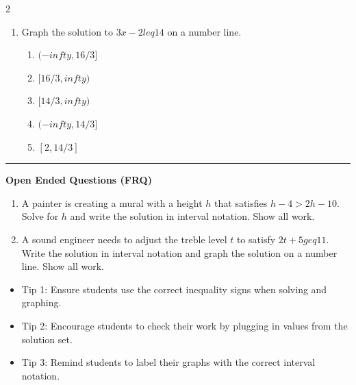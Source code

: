 \documentclass[10pt]{article}
\begin{document}
\begin{multicols}{2}
\begin{enumerate}[label=\textbf{Q\arabic*.}, leftmargin=*, itemsep=6pt, parsep=0pt]
  \item \small Graph the solution to $3x - 2 leq 14$ on a number line.
  \begin{enumerate}[label=(\Alph*), leftmargin=0.6cm, nosep, itemsep=2pt]
    \item $(-infty, 16/3]$
    \item $[16/3, infty)$
    \item $[14/3, infty)$
    \item $(-infty, 14/3]$
    \item $[2, 14/3]$
  \end{enumerate}

\end{enumerate}
\end{multicols}

\vspace{-0.2cm}
\hrule
\vspace{0.2cm}
\textbf{\small Open Ended Questions (FRQ)}
\begin{enumerate}[label=\textbf{Q\arabic*.}, start=9, itemsep=5pt, topsep=0pt]

  \item \small A painter is creating a mural with a height $h$ that satisfies $h - 4 > 2h - 10$. Solve for $h$ and write the solution in interval notation. Show all work. \vspace{2cm}

  \item \small A sound engineer needs to adjust the treble level $t$ to satisfy $2t + 5 geq 11$. Write the solution in interval notation and graph the solution on a number line. Show all work. \vspace{2cm}

\end{enumerate}

\vfill

\begin{tcolorbox}[colback=blue!5, colframe=mainblue!50, title=\small \textbf{Chef's Tips}, fonttitle=\bfseries, bottom=1mm]
\begin{itemize}[noitemsep, topsep=2pt, leftmargin=0.5cm]
  \item \scriptsize Tip 1: Ensure students use the correct inequality signs when solving and graphing.\item \scriptsize Tip 2: Encourage students to check their work by plugging in values from the solution set.\item \scriptsize Tip 3: Remind students to label their graphs with the correct interval notation.
\end{itemize}
\end{tcolorbox}
\end{document}
